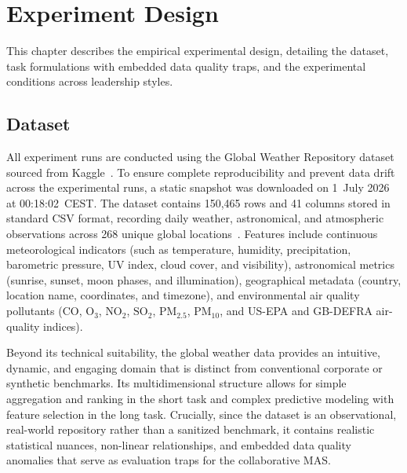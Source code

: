 \chapter{Experiment Design}
\label{chap:experiment-design}

This chapter describes the empirical experimental design, detailing the dataset, task formulations with embedded data quality traps, and the experimental conditions across leadership styles.

\section{Dataset}
\label{sec:dataset}

All experiment runs are conducted using the Global Weather Repository dataset sourced from Kaggle~\cite{nidula_elgiriyewithana_2026}.
To ensure complete reproducibility and prevent data drift across the experimental runs, a static snapshot was downloaded on 1~July 2026 at 00:18:02~CEST.
The dataset contains 150,465 rows and 41 columns stored in standard CSV format, recording daily weather, astronomical, and atmospheric observations across 268 unique global locations~\cite{nidula_elgiriyewithana_2026}.
Features include continuous meteorological indicators (such as temperature, humidity, precipitation, barometric pressure, UV index, cloud cover, and visibility), astronomical metrics (sunrise, sunset, moon phases, and illumination), geographical metadata (country, location name, coordinates, and timezone), and environmental air quality pollutants ($\text{CO}$, $\text{O}_3$, $\text{NO}_2$, $\text{SO}_2$, $\text{PM}_{2.5}$, $\text{PM}_{10}$, and US-EPA and GB-DEFRA air-quality indices).

Beyond its technical suitability, the global weather data provides an intuitive, dynamic, and engaging domain that is distinct from conventional corporate or synthetic benchmarks.
Its multidimensional structure allows for simple aggregation and ranking in the short task and complex predictive modeling with feature selection in the long task.
Crucially, since the dataset is an observational, real-world repository rather than a sanitized benchmark, it contains realistic statistical nuances, non-linear relationships, and embedded data quality anomalies that serve as evaluation traps for the collaborative \ac{MAS}.

